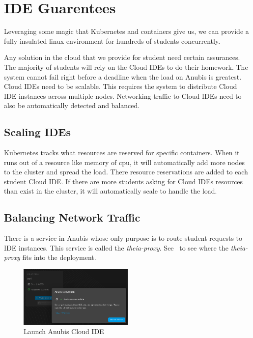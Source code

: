 \section{IDE Guarentees}\label{sec:ide-guarentees}

Leveraging some magic that Kubernetes and containers give us,
we can provide a fully insulated linux environment for hundreds of
students concurrently.

Any solution in the cloud that we provide for student need certain assurances.
The majority of students will rely on the Cloud IDEs to do their homework.
The system cannot fail right before a deadline when the load on Anubis is greatest.
Cloud IDEs need to be scalable.
This requires the system to distribute Cloud IDE instances across multiple nodes. 
Networking traffic to Cloud IDEs need to also be automatically detected and balanced.

\subsection{Scaling IDEs}\label{subsec:scaling-ides}

Kubernetes tracks what resources are reserved for specific containers.
When it runs out of a resource like memory of cpu, it will automatically
add more nodes to the cluster and spread the load.
There resource reservations are added to each student Cloud IDE.
If there are more students asking for Cloud IDEs resources than exist
in the cluster, it will automatically scale to handle the load.

\subsection{Balancing Network Traffic}\label{subsec:balancing-network-traffic}

There is a service in Anubis whose only purpose is to route
student requests to IDE instances. 
This service is called the \textit{theia-proxy}. 
See~ to see where the \textit{theia-proxy}
fits into the deployment.

\begin{figure}
    \centering
    \includegraphics[width=0.5\textwidth]{figures/theia1.png}
    \caption{Launch Anubis Cloud IDE\label{fig:theia1}}
\end{figure}

